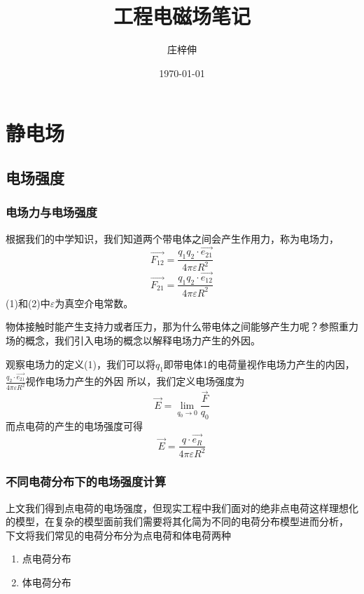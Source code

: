 \documentclass[UTF8]{article} %
\title{\heiti 工程电磁场笔记}
\author{\kaishu 庄梓伸}
\date{\kaishu \today}
\begin{document}
\maketitle

\section{静电场}
\subsection{电场强度}
\subsubsection{电场力与电场强度}
根据我们的中学知识，我们知道两个带电体之间会产生作用力，称为电场力，
\begin{equation}
    \vec{F_{12}}=\frac{q_{1} q_{2} \cdot \vec{e_{21}}}{4 \pi \varepsilon R^{2}}
\end{equation}
\begin{equation}
    \vec{F_{21}}=\frac{q_{1} q_{2} \cdot \vec{e_{12}}}{4 \pi \varepsilon R^{2}}
\end{equation}
(1)和(2)中$\varepsilon$为真空介电常数。

物体接触时能产生支持力或者压力，那为什么带电体之间能够产生力呢？参照重力场的概念，我们引入电场的概念以解释电场力产生的外因。

观察电场力的定义(1)，我们可以将$q_{1}$即带电体1的电荷量视作电场力产生的内因，$\frac{q_{2} \cdot \vec{e_{21}}}{4 \pi \varepsilon R^{2}}$视作电场力产生的外因
所以，我们定义电场强度为
\begin{equation}
    \vec{E}=\lim_{q_{0} \to 0}\frac{\vec{F}}{q_{0}}
\end{equation}
而点电荷的产生的电场强度可得
\begin{equation}
    \vec{E}=\frac{q \cdot \vec{e_{R}}}{4 \pi \varepsilon R^{2}}
\end{equation}

\subsubsection{不同电荷分布下的电场强度计算}
上文我们得到点电荷的电场强度，但现实工程中我们面对的绝非点电荷这样理想化的模型，在复杂的模型面前我们需要将其化简为不同的电荷分布模型进而分析，
下文将我们常见的电荷分布分为点电荷和体电荷两种
\begin{enumerate}
    \item 点电荷分布
    \item 体电荷分布
\end{enumerate}
\end{document}
